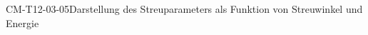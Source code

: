 
\begin{PROP}{CM-T12-03-05}{Darstellung des Streuparameters als Funktion von Streuwinkel und Energie}
\end{PROP}

